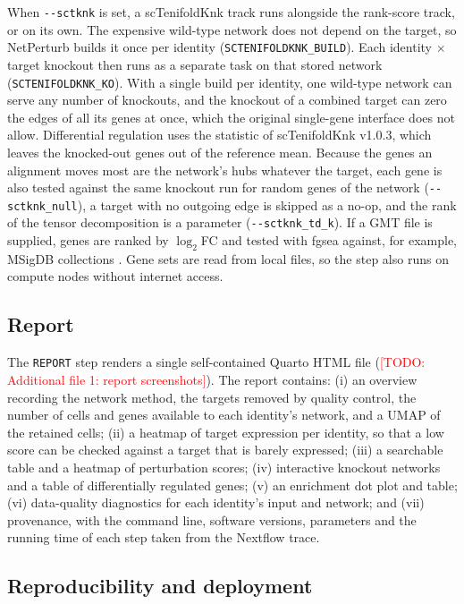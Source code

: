 \documentclass[pdflatex,sn-vancouver-num]{sn-jnl}%
\newcommand{\todo}[1]{\textcolor{red}{[TODO: #1]}}
\newcommand{\param}[1]{\texttt{-{}-#1}}
\begin{document}
When \param{sctknk} is set, a scTenifoldKnk track \citep{Osorio2022sctenifoldknk} runs alongside the rank-score track, or on its own. The expensive wild-type network does not depend on the target, so NetPerturb builds it once per identity (\texttt{SCTENIFOLDKNK\_BUILD}). Each identity $\times$ target knockout then runs as a separate task on that stored network (\texttt{SCTENIFOLDKNK\_KO}). With a single build per identity, one wild-type network can serve any number of knockouts, and the knockout of a combined target can zero the edges of all its genes at once, which the original single-gene interface does not allow. Differential regulation uses the statistic of scTenifoldKnk v1.0.3, which leaves the knocked-out genes out of the reference mean. Because the genes an alignment moves most are the network's hubs whatever the target, each gene is also tested against the same knockout run for random genes of the network (\param{sctknk\_null}), a target with no outgoing edge is skipped as a no-op, and the rank of the tensor decomposition is a parameter (\param{sctknk\_td\_k}). If a GMT file is supplied, genes are ranked by $\log_2$FC and tested with fgsea \citep{Korotkevich2016fgsea} against, for example, MSigDB collections \citep{Liberzon2015msigdb}. Gene sets are read from local files, so the step also runs on compute nodes without internet access.

\subsection{Report}

The \texttt{REPORT} step renders a single self-contained Quarto HTML file (\todo{Additional file 1: report screenshots}). The report contains:
(i) an overview recording the network method, the targets removed by quality control, the number of cells and genes available to each identity's network, and a UMAP of the retained cells;
(ii) a heatmap of target expression per identity, so that a low score can be checked against a target that is barely expressed;
(iii) a searchable table and a heatmap of perturbation scores;
(iv) interactive knockout networks and a table of differentially regulated genes;
(v) an enrichment dot plot and table;
(vi) data-quality diagnostics for each identity's input and network; and
(vii) provenance, with the command line, software versions, parameters and the running time of each step taken from the Nextflow trace.

\subsection{Reproducibility and deployment}
\end{document}
